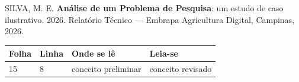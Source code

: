 %
%

\vspace{\onelineskip}

SILVA, M. E. \textbf{Análise de um Problema de Pesquisa}: um estudo de caso ilustrativo. 2026. Relatório Técnico --- Embrapa Agricultura Digital, Campinas, 2026.

\begin{table}[htb]
	\centering
	\footnotesize
	\begin{tabular}{|p{1.4cm}|p{1cm}|p{3cm}|p{3cm}|}
		\hline
		\textbf{Folha} & \textbf{Linha}  & \textbf{Onde se lê}  & \textbf{Leia-se}  \\
		\hline
		15 & 8 & conceito preliminar & conceito revisado \\
		\hline
	\end{tabular}
\end{table}

